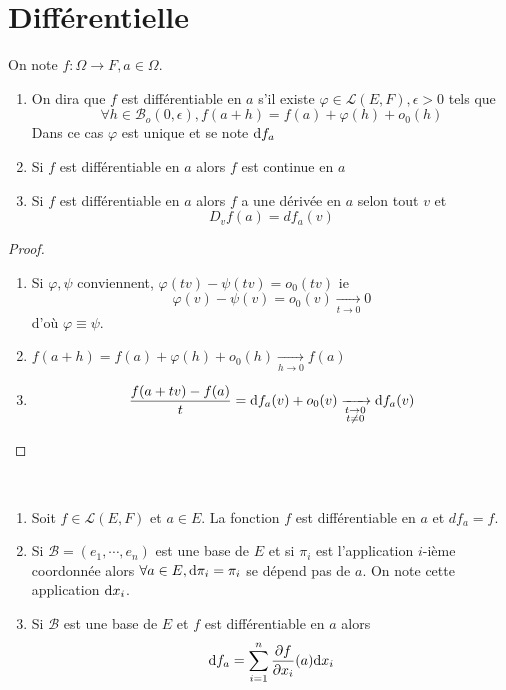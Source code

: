 \section{Différentielle}

\begin{defprop}
On note $f:\Omega\longrightarrow F, a\in \Omega$. \begin{enumerate}
    \item On dira que $f$ est différentiable en $a$ s'il existe $\varphi\in\mathcal L(E, F), \epsilon>0$ tels que \[
        \forall h\in\mathcal B_o(0, \epsilon), f(a+h)=f(a)+\varphi(h)+o_0(h)
    \]
    Dans ce cas $\varphi$ est unique et se note $\mathrm{d} f_a$
    \item Si $f$ est différentiable en $a$ alors $f$ est continue en $a$
    \item Si $f$ est différentiable en $a$ alors $f$ a une dérivée en $a$ selon tout $v$ et \[
        D_vf(a)=df_a(v)
    \]
\end{enumerate}
\end{defprop}

\begin{proof} ~
\begin{enumerate}
    \item Si $\varphi, \psi$ conviennent, $\varphi(tv)-\psi(tv)=o_0(tv)$ ie \[
        \varphi(v)-\psi(v)=o_0(v)\xrightarrow[t\to 0]{}0
    \]
    d'où $\varphi\equiv \psi$.
    \item $f(a+h)=f(a)+\varphi(h)+o_0(h)\xrightarrow[h\to 0]{}f(a)$
    \item \[
        \frac{f(a+tv)-f(a)}{t}=\mathrm{d} f_a(v)+o_0(v)\xrightarrow[\substack{t\to 0\\t\neq 0}]{}\mathrm{d} f_a(v)
    \]
\end{enumerate}
\end{proof}

\begin{thmdef}
~ \begin{enumerate}
    \item Soit $f\in\mathcal L(E, F)$ et $a\in E$. La fonction $f$ est différentiable en $a$ et $df_a=f$.
    \item Si $\mathcal B=(e_1, \cdots, e_n)$ est une base de $E$ et si $\pi_i$ est l'application $i$-ième coordonnée alors $\forall a\in E, \mathrm{d} \pi_i=\pi_i$ se dépend pas de $a$. On note cette application $\mathrm{d} x_i$.
    \item Si $\mathcal B$ est une base de $E$ et $f$ est différentiable en $a$ alors \[
        \mathrm{d} f_a=\sum_{i=1}^n\frac{\partial f}{\partial x_i}(a)\mathrm{d} x_i
    \]
\end{enumerate}
\end{thmdef}

